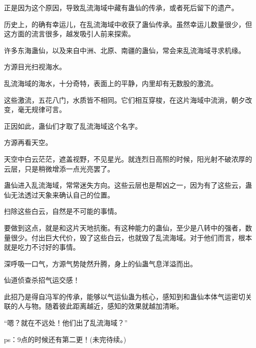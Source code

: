 \begin{this_body}
正是因为这个原因，导致乱流海域中藏有蛊仙的传承，或者死后留下的遗产。

历史上，的确有幸运儿，在乱流海域中收获了蛊仙传承。虽然幸运儿数量很少，但这方面的流言很多，越发吸引人前来探索。

许多东海蛊仙，以及来自中洲、北原、南疆的蛊仙，常会来乱流海域寻求机缘。

方源目光扫视海水。

乱流海域的海水，十分奇特，表面上的平静，内里却有无数股的激流。

这些激流，五花八门，水质皆不相同。它们相互穿梭，在这片海域中流淌，朝夕改变，毫无规律可言。

正因如此，蛊仙们才取了乱流海域这个名字。

方源再看天空。

天空中白云茫茫，遮盖视野，不见星光。就连烈日高照的时候，阳光射不破浓厚的云层，只是稍微增添一点光亮罢了。

蛊仙进入乱流海域，常常迷失方向。这些云层也是帮凶之一，因为有了这些云，蛊仙无法透过天象来确认自己的位置。

扫除这些白云，自然是不可能的事情。

要做到这点，就是和这片天地抗衡。有这种能力的蛊仙，至少是八转中的强者，数量很少。付出巨大代价，毁了这些白云，也就毁了乱流海域。对于他们而言，根本就是吃力不讨好的事情。

深呼吸一口气，方源气势陡然升腾，身上的仙蛊气息洋溢而出。

仙道侦查杀招气运交感！

此招乃是得自冯军的传承，能够以气运仙蛊为核心，感知到和蛊仙本体气运密切关联的人与物。随着彼此距离越近，感知的效果就越加清晰。

“嗯？就在不远处！他们出了乱流海域？”

ps：9点的时候还有第二更！(未完待续。)

\end{this_body}

